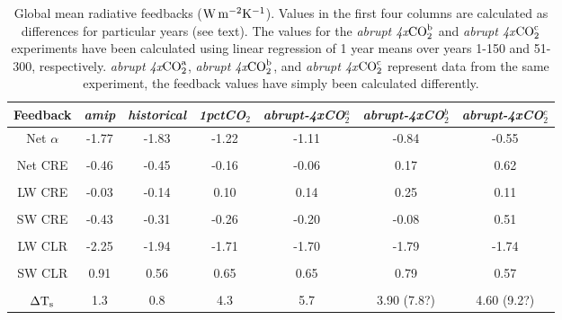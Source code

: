 \documentclass[draft]{agujournal2019}
\begin{document}
 
\begin{table}
\begin{center}
\caption{Global mean radiative feedbacks ($\rm{W\, m^{-2} K^{-1}}$).  Values in the first four columns are calculated as differences for 
particular years (see text).  The values for the \textit{abrupt 4x$\rm{CO}_2^{b}$} and  \textit{abrupt 4x$\rm{CO}_2^{c}$} experiments
have been calculated using linear regression of 1 year means over years 1-150 and 51-300, respectively.  
\textit{abrupt 4x$\rm{CO}_2^{a}$}, \textit{abrupt 4x$\rm{CO}_2^{b}$}, and \textit{abrupt 4x$\rm{CO}_2^{c}$} represent data from the same experiment, the feedback values have simply been calculated differently.
}
    \begin{tabular}{*{7}{c}}
    \hline
    \hline
 Feedback     &  \textit{amip }  & \textit{historical}   &  \textit{1pctCO$_2$} & \textit{abrupt-4xCO$_2^{a}$} & \textit{abrupt-4xCO$_2^{b}$} & \textit{abrupt-4xCO$_2^{c}$}  \\ \hline
    Net $\alpha$    & -1.77      &   -1.83      &  -1.22          &  -1.11    &  -0.84   &   -0.55              \\ 
    \\
    Net CRE  &    -0.46            &   -0.45       &  -0.16          & -0.06   & 0.17      &   0.62         \\  
    \\
    LW CRE    &   -0.03           &   -0.14        &  0.10            & 0.14   &  0.25        & 0.11          \\  
    \\
    SW CRE  &     -0.43             &    -0.31       &  -0.26            & -0.20    &  -0.08      &  0.51         \\  
    \\
    LW CLR   &     -2.25             &    -1.94       &  -1.71            & -1.70    &   -1.79      & -1.74        \\  
    \\
    SW CLR  &      0.91            &     0.56        & 0.65              & 0.65    &    0.79         & 0.57          \\  
    \\
    $\Delta \rm{T}_s$     &     1.3     & 0.8        &  4.3           & 5.7     &   3.90 (7.8?)        &   4.60 (9.2?)         \\  \hline

    \end{tabular}\par
    \label{tab:lambda_AOGCM}
\end{center}
\end{table}
\end{document}
